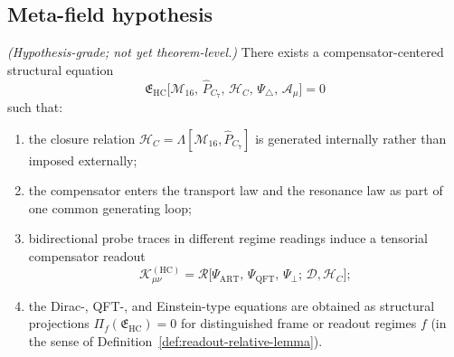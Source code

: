 \subsection*{Meta-field hypothesis}

\begin{proposition}
\label{hyp:hc-meta-generator}
\emph{(Hypothesis-grade; not yet theorem-level.)}
There exists a compensator-centered structural equation
\[
  \mathfrak{E}_{\mathrm{HC}}
  \bigl[
    \mathcal{M}_{16},\,
    \hat{P}_{C_7},\,
    \mathcal{H}_C,\,
    \Psi_\triangle,\,
    \mathcal{A}_\mu
  \bigr]
  = 0
\]
such that:
\begin{enumerate}[label=(\roman*)]
  \item the closure relation
        $\mathcal{H}_C = \Lambda[\mathcal{M}_{16},\hat{P}_{C_7}]$
        is generated internally rather than imposed externally;
  \item the compensator enters the transport law and the resonance law
        as part of one common generating loop;
  \item bidirectional probe traces in different regime readings induce a
        tensorial compensator readout
        \[
          \mathcal{K}_{\mu\nu}^{(\mathrm{HC})}
          =
          \mathcal{R}\bigl[
            \Psi_{\mathrm{ART}},\,
            \Psi_{\mathrm{QFT}},\,
            \Psi_\perp;\,
            \mathcal{D},\mathcal{H}_C
          \bigr];
        \]
  \item the Dirac-, QFT-, and Einstein-type equations are obtained as
        structural projections
        $\Pi_f(\mathfrak{E}_{\mathrm{HC}}) = 0$
        for distinguished frame or readout regimes $f$
        (in the sense of Definition~\ref{def:readout-relative-lemma}).
\end{enumerate}
\end{proposition}

